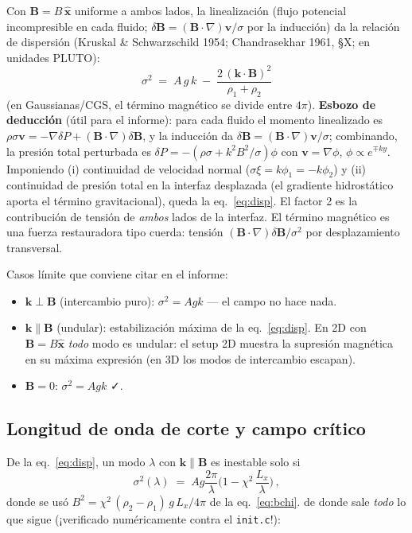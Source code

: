 \documentclass[11pt,a4paper]{article}
\newcommand{\B}{\mathbf{B}}
\newcommand{\vct}{\mathbf{v}}
\newcommand{\code}[1]{\texttt{#1}}
\begin{document}
Con $\B=B\,\hat{\mathbf{x}}$ uniforme a ambos lados, la linealización (flujo potencial
incompresible en cada fluido; $\delta\B=(\B\cdot\nabla)\vct/\sigma$ por la inducción) da la
relación de dispersión (Kruskal \& Schwarzschild 1954; Chandrasekhar 1961, §X;
en unidades PLUTO):
\begin{equation}
\boxed{\ \sigma^2 \;=\; A\,g\,k \;-\; \frac{2\,(\mathbf{k}\cdot\B)^2}{\rho_1+\rho_2}\ }
\label{eq:disp}
\end{equation}
(en Gaussianas/CGS, el término magnético se divide entre $4\pi$).
\textbf{Esbozo de deducción} (útil para el informe): para cada fluido el momento linealizado
es $\rho\sigma\vct=-\nabla\delta P + (\B\cdot\nabla)\delta\B$, y la inducción da
$\delta\B=(\B\cdot\nabla)\vct/\sigma$; combinando, la presión total perturbada es
$\delta P=-(\rho\sigma + k^2B^2/\sigma)\phi$ con $\vct=\nabla\phi$, $\phi\propto e^{\mp ky}$.
Imponiendo (i) continuidad de velocidad normal ($\sigma\xi=k\phi_1=-k\phi_2$) y (ii)
continuidad de presión total en la interfaz desplazada (el gradiente hidrostático aporta el
término gravitacional), queda la eq.~\eqref{eq:disp}. El factor 2 es la contribución de
tensión de \emph{ambos} lados de la interfaz. El término magnético es una fuerza restauradora
tipo cuerda: tensión $(\B\cdot\nabla)\delta\B/\sigma^2$ por desplazamiento transversal.

Casos límite que conviene citar en el informe:
\begin{itemize}[nosep]
  \item $\mathbf{k}\perp\B$ (intercambio puro): $\sigma^2=Agk$ --- el campo no hace nada.
  \item $\mathbf{k}\parallel\B$ (undular): estabilización máxima de la eq.~\eqref{eq:disp}.
  En 2D con $\B=B\hat{\mathbf{x}}$ \emph{todo} modo es undular: el setup 2D muestra la
  supresión magnética en su máxima expresión (en 3D los modos de intercambio escapan).
  \item $\B=0$: $\sigma^2=Agk$ ✓.
\end{itemize}

\subsection{Longitud de onda de corte y campo crítico}
\label{sec:lineal-bc}

De la eq.~\eqref{eq:disp}, un modo $\lambda$ con $\mathbf{k}\parallel\B$ es inestable solo si
\begin{equation}
\sigma^2(\lambda) \;=\; A g \frac{2\pi}{\lambda}\Big(1-\chi^2\,\frac{L_x}{\lambda}\Big)\,,
\label{eq:disp-lambda}
\end{equation}
donde se usó $B^2=\chi^2\,(\rho_2-\rho_1)\,g\,L_x/4\pi$ de la eq.~\eqref{eq:bchi}.
de donde sale \emph{todo} lo que sigue (¡verificado numéricamente contra el \code{init.c}!):
\end{document}
